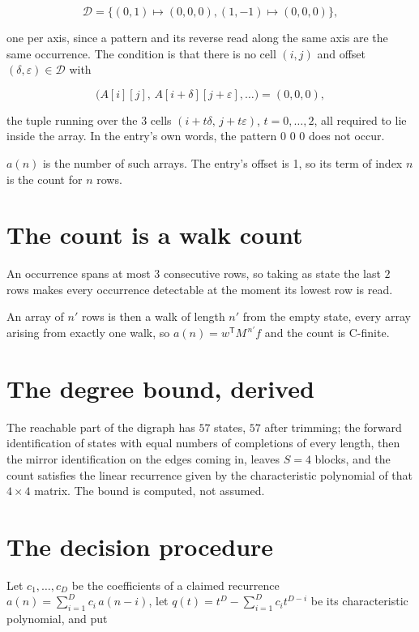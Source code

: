 \documentclass[11pt]{article}
\theoremstyle{definition}
\begin{document}
\[\mathcal{D} = \{(0,1)\mapsto(0,0,0), (1,-1)\mapsto(0,0,0)\},\]

one per axis, since a pattern and its reverse read along the same axis are the same occurrence. The condition is that there is no cell $(i,j)$ and offset $(\delta,\varepsilon)\in\mathcal{D}$ with

\[\bigl(A[i][j],\,A[i{+}\delta][j{+}\varepsilon],\dots\bigr) = (0, 0, 0),\]

the tuple running over the $3$ cells $(i+t\delta,\,j+t\varepsilon)$, $t = 0,\dots,2$, all required to lie inside the array. In the entry's own words, the pattern 0 0 0 does not occur.

$a(n)$ is the number of such arrays. The entry's offset is 1, so its term of index $n$ is the count for $n$ rows.

\section{The count is a walk count}

An occurrence spans at most $3$ consecutive rows, so taking as state the last $2$ rows makes every occurrence detectable at the moment its lowest row is read.

An array of $n'$ rows is then a walk of length $n'$ from the empty state, every array arising from exactly one walk, so $a(n) = w^{\mathsf T}M^{\,n'}f$ and the count is C-finite.

\section{The degree bound, derived}

The reachable part of the digraph has $57$ states, $57$ after trimming; the forward identification of states with equal numbers of completions of every length, then the mirror identification on the edges coming in, leaves $S = 4$ blocks, and the count satisfies the linear recurrence given by the characteristic polynomial of that $4\times4$ matrix. The bound is computed, not assumed.

\section{The decision procedure}

Let $c_1,\dots,c_D$ be the coefficients of a claimed recurrence $a(n) = \sum_{i=1}^{D} c_i\,a(n-i)$, let $q(t) = t^{D} - \sum_{i=1}^{D} c_i t^{D-i}$ be its characteristic polynomial, and put
\end{document}
